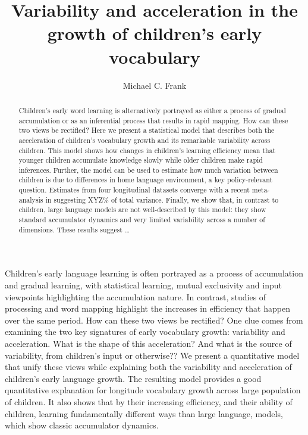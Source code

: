 \documentclass[
]{pnas-new}
\title{Variability and acceleration in the growth of children's early
vocabulary}
\author[aff-1%
%
%
]{Michael C. Frank}
\affil[aff-1]{Department of Psychology, Stanford University}
\begin{document}
\maketitle

\begin{abstract}
Children's early word learning is alternatively portrayed as either a
process of gradual accumulation or as an inferential process that
results in rapid mapping. How can these two views be rectified? Here we
present a statistical model that describes both the acceleration of
children's vocabulary growth and its remarkable variability across
children. This model shows how changes in children's learning efficiency
mean that younger children accumulate knowledge slowly while older
children make rapid inferences. Further, the model can be used to
estimate how much variation between children is due to differences in
home language environment, a key policy-relevant question. Estimates
from four longitudinal datasets converge with a recent meta-analysis in
suggesting XYZ\% of total variance. Finally, we show that, in contrast
to children, large language models are not well-described by this model:
they show standard accumulator dynamics and very limited variability
across a number of dimensions. These results suggest \ldots{}
\end{abstract}


\thispagestyle{firststyle}

Children's early language learning is often portrayed as a process of
accumulation and gradual learning, with statistical learning, mutual
exclusivity and input viewpoints highlighting the accumulation nature.
In contrast, studies of processing and word mapping highlight the
increases in efficiency that happen over the same period. How can these
two views be rectified? One clue comes from examining the two key
signatures of early vocabulary growth: variability and acceleration.
What is the shape of this acceleration? And what is the source of
variability, from children's input or otherwise?? We present a
quantitative model that unify these views while explaining both the
variability and acceleration of children's early language growth. The
resulting model provides a good quantitative explanation for longitude
vocabulary growth across large population of children. It also shows
that by their increasing efficiency, and their ability of children,
learning fundamentally different ways than large language, models, which
show classic accumulator dynamics.
\end{document}
